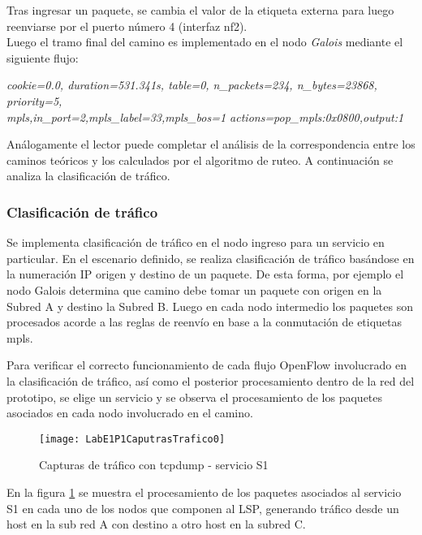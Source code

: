 Tras ingresar un paquete, se cambia el valor de la etiqueta externa para luego reenviarse por el puerto n\'umero 4 (interfaz nf2).\\

Luego el tramo final del camino es implementado en el nodo \textit{Galois} mediante el siguiente flujo:

\begin{center}
\textit{cookie=0.0, duration=531.341s, table=0, n\_packets=234, n\_bytes=23868, priority=5, \\
mpls,in\_port=2,mpls\_label=33,mpls\_bos=1 actions=pop\_mpls:0x0800,output:1 }
\end{center}

Análogamente el lector puede completar el análisis de la correspondencia entre los caminos te\'oricos y los calculados por el algoritmo de ruteo. A continuaci\'on se analiza la clasificaci\'on de tr\'afico.
 
\subsubsection{Clasificaci\'on de tr\'afico}
Se implementa clasificaci\'on de tr\'afico en el nodo ingreso para un servicio en particular. En el escenario definido, se realiza clasificaci\'on de tr\'afico basándose en la numeraci\'on IP origen y destino de un paquete. De esta forma, por ejemplo el nodo Galois determina que camino debe tomar un paquete con origen en la Subred A y destino la Subred B. Luego en cada nodo intermedio los paquetes son procesados acorde a las reglas de reenvío en base a la conmutación de etiquetas mpls.

Para verificar el correcto funcionamiento de cada flujo OpenFlow involucrado en la clasificaci\'on de tr\'afico, as\'i como el posterior procesamiento dentro de la red del prototipo, se elige un servicio y se observa el procesamiento de los paquetes asociados en cada nodo involucrado en el camino.\\

\begin{figure}[ht!] 
\centering    
\texttt{[image: LabE1P1CaputrasTrafico0]}
\caption[Capturas de tr\'afico con tcpdump - servicio S1]{Capturas de tr\'afico con tcpdump - servicio S1}
\label{fig:LabE1P1CapsTraf}
\end{figure}

En la figura \ref{fig:LabE1P1CapsTraf} se muestra el procesamiento de los paquetes asociados al servicio S1 en cada uno de los nodos que componen al LSP, generando tr\'afico desde un host en la sub red A con destino a otro host en la subred C.

